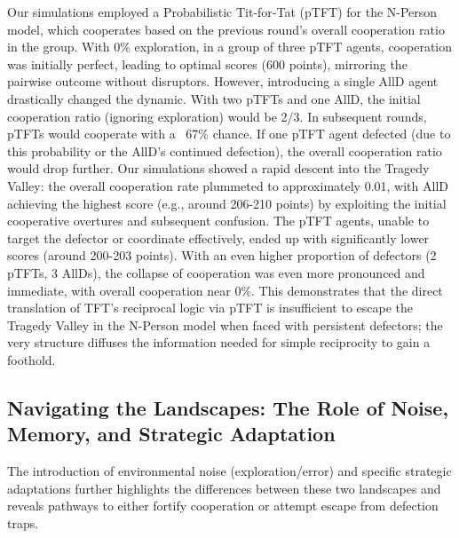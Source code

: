 \documentclass[]{llncs} %
\begin{document}
Our simulations employed a Probabilistic Tit-for-Tat (pTFT) for the N-Person model, which cooperates based on the previous round's overall cooperation ratio in the group.
With 0\% exploration, in a group of three pTFT agents, cooperation was initially perfect, leading to optimal scores (600 points), mirroring the pairwise outcome without disruptors.
However, introducing a single AllD agent drastically changed the dynamic. With two pTFTs and one AllD, the initial cooperation ratio (ignoring exploration) would be 2/3. In subsequent rounds, pTFTs would cooperate with a ~67\% chance. If one pTFT agent defected (due to this probability or the AllD's continued defection), the overall cooperation ratio would drop further. Our simulations showed a rapid descent into the Tragedy Valley: the overall cooperation rate plummeted to approximately 0.01, with AllD achieving the highest score (e.g., around 206-210 points) by exploiting the initial cooperative overtures and subsequent confusion. The pTFT agents, unable to target the defector or coordinate effectively, ended up with significantly lower scores (around 200-203 points). With an even higher proportion of defectors (2 pTFTs, 3 AllDs), the collapse of cooperation was even more pronounced and immediate, with overall cooperation near 0\%. This demonstrates that the direct translation of TFT's reciprocal logic via pTFT is insufficient to escape the Tragedy Valley in the N-Person model when faced with persistent defectors; the very structure diffuses the information needed for simple reciprocity to gain a foothold.

\subsection{Navigating the Landscapes: The Role of Noise, Memory, and Strategic Adaptation}
The introduction of environmental noise (exploration/error) and specific strategic adaptations further highlights the differences between these two landscapes and reveals pathways to either fortify cooperation or attempt escape from defection traps.
\end{document}
